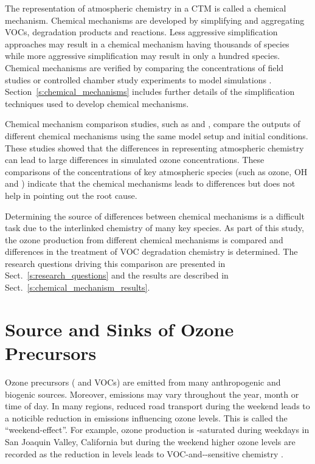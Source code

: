 The representation of atmospheric chemistry in a CTM is called a chemical mechanism.
Chemical mechanisms are developed by simplifying and aggregating VOCs, degradation products and reactions.
Less aggressive simplification approaches may result in a chemical mechanism having thousands of species while more aggressive simplification may result in only a hundred species. 
Chemical mechanisms are verified by comparing the concentrations of field studies or controlled chamber study experiments to model simulations \citep{Stockwell:2012}.
Section~\ref{s:chemical_mechanisms} includes further details of the simplification techniques used to develop chemical mechanisms.

Chemical mechanism comparison studies, such as \citet{Kuhn:1998} and \citet{Emmerson:2009}, compare the outputs of different chemical mechanisms using the same model setup and initial conditions.
These studies showed that the differences in representing atmospheric chemistry can lead to large differences in simulated ozone concentrations.
These comparisons of the concentrations of key atmospheric species (such as ozone, OH and ) indicate that the chemical mechanisms leads to differences but does not help in pointing out the root cause.

Determining the source of differences between chemical mechanisms is a difficult task due to the interlinked chemistry of many key species.
As part of this study, the ozone production from different chemical mechanisms is compared and differences in the treatment of VOC degradation chemistry is determined.
The research questions driving this comparison are presented in Sect.~\ref{s:research_questions} and the results are described in Sect.~\ref{s:chemical_mechanism_results}.

\section{Source and Sinks of Ozone Precursors} \label{s:precursor_emissions}
Ozone precursors ( and VOCs) are emitted from many anthropogenic and biogenic sources.
Moreover, emissions may vary throughout the year, month or time of day.
In many regions, reduced road transport during the weekend leads to a noticible reduction in  emissions influencing ozone levels.
This is called the ``weekend-effect''.
For example, ozone production is -saturated during weekdays in San Joaquin Valley, California but during the weekend higher ozone levels are recorded as the reduction in  levels leads to VOC-and--sensitive chemistry \citep{Pusede:2014}.

